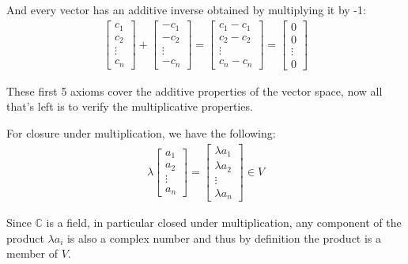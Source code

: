 \documentclass{article}
\begin{document}
And every vector has an additive inverse obtained by multiplying it by -1:
\begin{align*}
    \begin{bmatrix}
        c_1 \\
        c_2\\
        \vdots\\
        c_n
    \end{bmatrix}+\begin{bmatrix}
        -c_1 \\
        -c_2\\
        \vdots\\
        -c_n
    \end{bmatrix}=\begin{bmatrix}
        c_1-c_1 \\
        c_2-c_2\\
        \vdots\\
        c_n-c_n
    \end{bmatrix}=\begin{bmatrix}
        0 \\
        0\\
        \vdots\\
        0
    \end{bmatrix}\tag{VS5}
\end{align*}

These first 5 axioms cover the additive properties of the vector space, now all that's left is to verify the multiplicative properties.

For closure under multiplication, we have the following:
\begin{align*}
    \lambda\begin{bmatrix}
        a_1 \\
        a_2\\
        \vdots\\
        a_n
    \end{bmatrix}=\begin{bmatrix}
        \lambda a_1 \\
        \lambda a_2 \\
        \vdots\\
        \lambda a_n
    \end{bmatrix}\in V\tag{VS6}
\end{align*}

Since $\mathbb C$ is a field, in particular closed under multiplication, any component of the product $\lambda a_i$ is also a complex number and thus by definition the product is a member of $V$.
\end{document}
